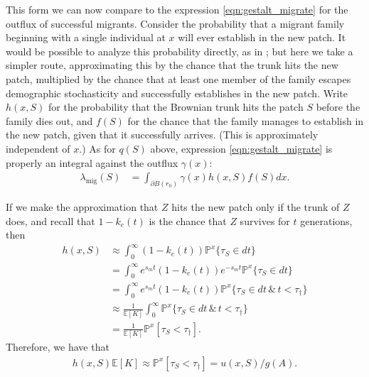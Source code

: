 \documentclass[10pt,letterpaper]{article}
\newcommand{\citet}[1]{\cite{#1}}
\renewcommand{\P}{\mathbb{P}}
\newcommand{\E}{\mathbb{E}}
\newcommand{\migrate}{\lambda_\text{mig}}
\begin{document}
This form we can now compare to 
the expression \eqref{eqn:gestalt_migrate} for the outflux of successful migrants.
Consider the probability that a migrant family beginning with a single individual at $x$ will ever establish in the new patch.
It would be possible to analyze this probability directly,
as in \citet{barton1987establishment};
but here we take a simpler route, 
approximating this by the chance that the trunk hits the new patch,
multiplied by the chance that at least one member of the family escapes demographic stochasticity
and successfully establishes in the new patch.
Write $h(x,S)$ for the probability that the Brownian trunk hits the patch $S$
before the family dies out,
and $f(S)$ for the chance that the family manages to establish in the new patch,
given that it successfully arrives.
(This is approximately independent of $x$.)
As for $q(S)$ above, expression \eqref{eqn:gestalt_migrate} is properly an integral against the outflux $\gamma(x)$:
\begin{align}\label{eqn:migrate_integral}
  \migrate(S) &= \int_{\partial B(r_0)} \gamma(x) h(x,S) f(S) dx .
\end{align}


If we make the approximation that $Z$ hits the new patch only if the trunk of $Z$ does,
and recall that $1-k_e(t)$ is the chance that $Z$ survives for $t$ generations,
then 
\begin{align}
    h(x,S) &\approx \int_0^\infty (1-k_e(t)) \P^x\{ \tau_S \in dt \} \\
           &= \int_0^\infty e^{s_m t} (1-k_e(t)) e^{- s_m t } \P^x\{ \tau_S \in dt \} \\
           &=\int_0^\infty e^{s_m t} (1-k_e(t)) \P^x\{ \tau_S \in dt \, \& \, t < \tau_\dagger \} \\
           &\approx \frac{1}{\E[K]} \int_0^\infty \P^x\{ \tau_S \in dt \, \& \, t < \tau_\dagger \} \\
    &= \frac{1}{\E[K]} \P^x[ \tau_S < \tau_\dagger ] .
\end{align}
Therefore, we have that
\begin{align} \label{eqn:boils_downto}
    h(x,S) \E[K] 
    \approx \P^x[ \tau_S < \tau_\dagger ] 
    = u(x,S) / g(A) .
\end{align}
\end{document}
